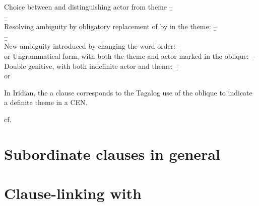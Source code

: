 \pex[interpartskip=0pt]
    \a Choice between \Obl{} and \Gen{} distinguishing actor from theme
    \beginsubsub{}
        \b{--}{\\ }
        \b{--}{\\ }
    \endsubsub
    \a Resolving ambiguity by obligatory replacement of \Gen{} by \Obl{} in the theme:
    \beginsubsub
        \b{--}{\\
        }
        \b{--}{\\
        }
    \endsubsub
    \a New ambiguity introduced by changing the word order:
    \beginsubsub
        \b{--} {\\
         or }
    \endsubsub
    \a Ungrammatical form, with both the theme and actor marked in the oblique:
    \beginsubsub
        \b{--}{\ljudge{*}\\
        }
    \endsubsub
    \a Double genitive, with both indefinite actor and theme:
    \beginsubsub
        \b{--}{\\
         or } 
    \endsubsub
\xe


In Iridian, the a  clause corresponds to the Tagalog use of the oblique to indicate a definite theme in a CEN. 


cf. \cite[297--8]{okuna}

\section{Subordinate clauses in general}

\section{Clause-linking with }



